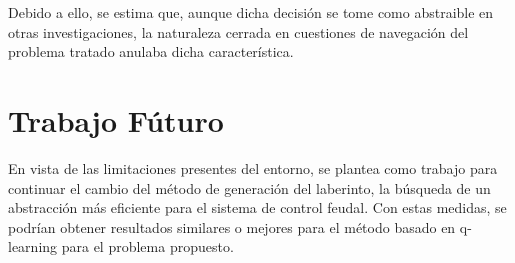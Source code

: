 \documentclass[letterpaper]{article} %
\begin{document}
Debido a ello, se estima que, aunque dicha decisión se tome como abstraible en otras investigaciones, la naturaleza cerrada en cuestiones de navegación del problema
tratado anulaba dicha característica.

\section{Trabajo Fúturo}
En vista de las limitaciones presentes del entorno, se plantea como trabajo para continuar 
el cambio del método de generación del laberinto, la búsqueda de un abstracción más eficiente 
para el sistema de control feudal. Con estas medidas, se podrían obtener resultados similares o 
mejores para el método basado en q-learning para el problema propuesto.


\end{document}
